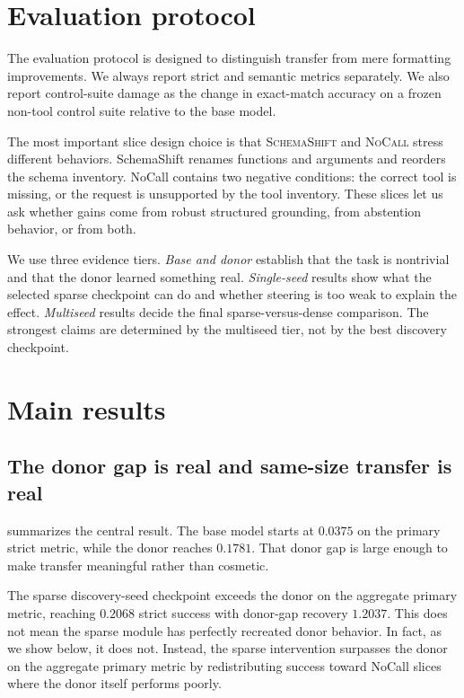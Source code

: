 \documentclass{article}
\begin{document}
\section{Evaluation protocol}
The evaluation protocol is designed to distinguish transfer from mere formatting improvements. We always report strict and semantic metrics separately. We also report control-suite damage as the change in exact-match accuracy on a frozen non-tool control suite relative to the base model.

The most important slice design choice is that \textsc{SchemaShift} and \textsc{NoCall} stress different behaviors. SchemaShift renames functions and arguments and reorders the schema inventory. NoCall contains two negative conditions: the correct tool is missing, or the request is unsupported by the tool inventory. These slices let us ask whether gains come from robust structured grounding, from abstention behavior, or from both.

We use three evidence tiers. \emph{Base and donor} establish that the task is nontrivial and that the donor learned something real. \emph{Single-seed} results show what the selected sparse checkpoint can do and whether steering is too weak to explain the effect. \emph{Multiseed} results decide the final sparse-versus-dense comparison. The strongest claims are determined by the multiseed tier, not by the best discovery checkpoint.

\section{Main results}
\subsection{The donor gap is real and same-size transfer is real}
 summarizes the central result. The base model starts at $0.0375$ on the primary strict metric, while the donor reaches $0.1781$. That donor gap is large enough to make transfer meaningful rather than cosmetic.

The sparse discovery-seed checkpoint exceeds the donor on the aggregate primary metric, reaching $0.2068$ strict success with donor-gap recovery $1.2037$. This does not mean the sparse module has perfectly recreated donor behavior. In fact, as we show below, it does not. Instead, the sparse intervention surpasses the donor on the aggregate primary metric by redistributing success toward NoCall slices where the donor itself performs poorly.
\end{document}
